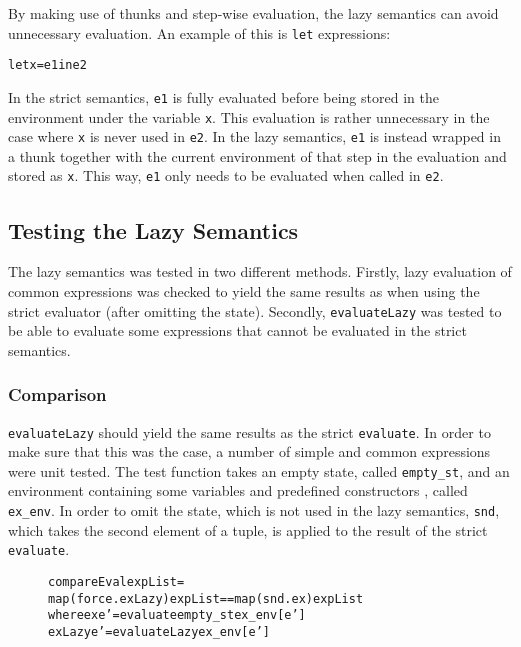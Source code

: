 By making use of thunks and step-wise evaluation, the lazy semantics can avoid unnecessary
evaluation. An example of this is \texttt{let} expressions:
\begin{alltt}
  let x = e1 in e2
\end{alltt}
In the strict semantics, \texttt{e1} is fully evaluated before being stored in the
environment under the variable \texttt{x}. 
This evaluation is rather unnecessary in the case where \texttt{x} is never used in
\texttt{e2}. In the lazy semantics, \texttt{e1} is instead wrapped in a thunk together with
the current environment of that step in the evaluation and stored as \texttt{x}. This way,
\texttt{e1} only needs to be evaluated when called in \texttt{e2}.

\subsection{Testing the Lazy Semantics}
\label{LazySemTest}

The lazy semantics was tested in two different methods.
Firstly, lazy evaluation of common
expressions was checked to yield the same results as when using the strict
evaluator (after omitting the state). Secondly, \texttt{evaluateLazy}
was tested to be able to evaluate some expressions that cannot be evaluated
in the strict semantics.


\subsubsection{Comparison}

\texttt{evaluateLazy} should yield the same results as the strict
\texttt{evaluate}. In order to make sure that this was the case, a number of
simple and common expressions were unit tested.
The test function takes an empty state, called \texttt{empty\_st}, and
an environment containing some variables and predefined constructors
, called \texttt{ex\_env}. In order to omit the state, which is not used in
the lazy semantics, \texttt{snd}, which takes the second element of a tuple,
is applied to the result of the strict \texttt{evaluate}.

\begin{figure}[!ht]
\begin{alltt}
  compareEval expList =
    map (force . exLazy) expList == map (snd . ex) expList
      where ex     e' = evaluate empty_st ex_env [e']
            exLazy e' = evaluateLazy ex_env [e']
\end{alltt}
\end{figure}


